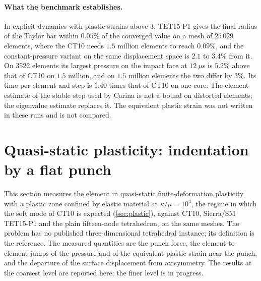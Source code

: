 \documentclass{article}
\theoremstyle{definition}
\theoremstyle{plain}
\begin{document}
\paragraph{What the benchmark establishes.} In explicit dynamics with plastic
strains above $3$, TET15-P1 gives the final radius of the Taylor bar within
$0.05\%$ of the converged value on a mesh of $25\,029$ elements, where the
CT10 needs $1.5$ million elements to reach $0.09\%$, and
the constant-pressure variant on the same displacement space is $2.1$ to
$3.4\%$ from it. On $3522$ elements its largest pressure on the impact
face at $12~\mu$s is $5.2\%$ above that of CT10 on
$1.5$ million, and on $1.5$ million elements the two differ by $3\%$. Its time per element and step is $1.40$ times
that of CT10 on one core. The element estimate of the
stable step used by Carina is not a bound on distorted elements; the
eigenvalue estimate replaces it. The equivalent plastic strain was not
written in these runs and is not compared.

\section{Quasi-static plasticity: indentation by a flat punch}
\label{sec:punch}

This section measures the element in quasi-static finite-deformation
plasticity with a plastic zone confined by elastic material at
$\kappa/\mu = 10^4$, the regime in which the soft mode of CT10 is expected (\cref{sec:plastic}), against CT10, Sierra/SM TET15-P1 and the
plain fifteen-node tetrahedron, on the same meshes. The problem has no
published three-dimensional tetrahedral instance; its definition is the
reference. The measured quantities are the punch force, the element-to-element
jumps of the pressure and of the equivalent plastic strain near the punch,
and the departure of the surface displacement from axisymmetry. The results
at the coarsest level are reported here; the finer level is in progress.
\end{document}
